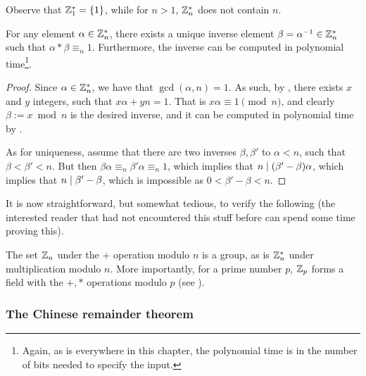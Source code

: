 \begin{remark}
    Observe that $\mathbb{Z}_1^* = \left\{ {1} \right\}$, while for $n >1$, $\mathbb{Z}_n^*$ does
    not contain $n$.
\end{remark}

\begin{lemma}
    For any element $\alpha \in \mathbb{Z}_n^*$, there exists a unique
    inverse element $\beta = \alpha^{-1} \in \mathbb{Z}_n^*$ such that
    $\alpha * \beta \equiv_n 1$. Furthermore, the inverse can be
    computed in polynomial time\footnote{Again, as is everywhere in
       this chapter, the polynomial time is in the number of bits
       needed to specify the input.}.
\end{lemma}

\begin{proof}
    Since $\alpha \in \mathbb{Z}_n^*$, we have that $\gcd(\alpha, n) =1$. As
    such,\newline
    by , there exists $x$ and $y$
    integers, such that $x \alpha + y n =1$. That is
    $x \alpha \equiv 1 \pmod{n}$, and clearly $\beta := x \bmod n$ is
    the desired inverse, and it can be computed in polynomial time by
    .

    As for uniqueness, assume that there are two inverses
    $\beta,\beta'$ to $\alpha < n$, such that $\beta < \beta' <
    n$. But then $\beta \alpha \equiv_n \beta' \alpha \equiv_n 1$,
    which implies that $n \mid (\beta' -\beta) \alpha$, which
    implies that $n \mid \beta' - \beta$, which is impossible as
    $0 < \beta' - \beta < n$.
\end{proof}

It is now straightforward, but somewhat tedious, to verify the
following (the interested reader that had not encountered this stuff
before can spend some time proving this).
\begin{lemma}
    The set $\mathbb{Z}_n$ under the $+$ operation modulo $n$ is a group, as
    is $\mathbb{Z}_n^*$ under multiplication modulo $n$. More importantly,
    for a prime number $p$, $\mathbb{Z}_p$ forms a field with the $+,*$
    operations modulo $p$ (see ).
\end{lemma}

\subsubsection{The Chinese remainder theorem}

